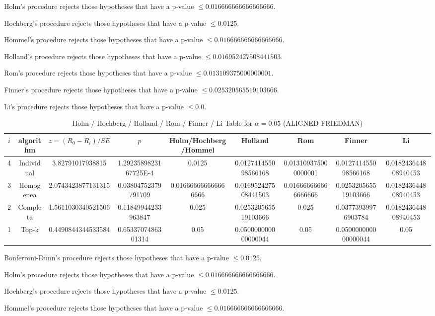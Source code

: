 \documentclass[a4paper,10pt]{article}
\begin{document}
\begin{landscape}
Holm's procedure rejects those hypotheses that have a p-value $\le0.016666666666666666$.


Hochberg's procedure rejects those hypotheses that have a p-value $\le0.0125$.


Hommel's procedure rejects those hypotheses that have a p-value $\le0.016666666666666666$.


Holland's procedure rejects those hypotheses that have a p-value $\le0.016952427508441503$.


Rom's procedure rejects those hypotheses that have a p-value $\le0.013109375000000001$.


Finner's procedure rejects those hypotheses that have a p-value $\le0.025320565519103666$.


Li's procedure rejects those hypotheses that have a p-value $\le0.0$.



\newpage

\begin{table}[!htp]
\centering\scriptsize
\caption{Holm / Hochberg / Holland / Rom / Finner / Li Table for $\alpha=0.05$ (ALIGNED FRIEDMAN)}
\begin{tabular}{ccccccccc}
$i$&algorithm&$z=(R_0 - R_i)/SE$&$p$&Holm/Hochberg/Hommel&Holland&Rom&Finner&Li\\
\hline
4&Individual&3.82791017938815&1.2923589823167725E-4&0.0125&0.012741455098566168&0.013109375000000001&0.012741455098566168&0.018243644808940453\\
3&Homogenea&2.0743423877131315&0.03804752379791709&0.016666666666666666&0.016952427508441503&0.016666666666666666&0.025320565519103666&0.018243644808940453\\
2&Completa&1.5611030340521506&0.11849944233963847&0.025&0.025320565519103666&0.025&0.03773939976903784&0.018243644808940453\\
1&Top-k&0.4490844344533584&0.6533707486301314&0.05&0.050000000000000044&0.05&0.050000000000000044&0.05\\
\hline
\end{tabular}
\end{table}
Bonferroni-Dunn's procedure rejects those hypotheses that have a p-value $\le0.0125$.


Holm's procedure rejects those hypotheses that have a p-value $\le0.016666666666666666$.


Hochberg's procedure rejects those hypotheses that have a p-value $\le0.0125$.


Hommel's procedure rejects those hypotheses that have a p-value $\le0.016666666666666666$.



\end{landscape}
\end{document}
